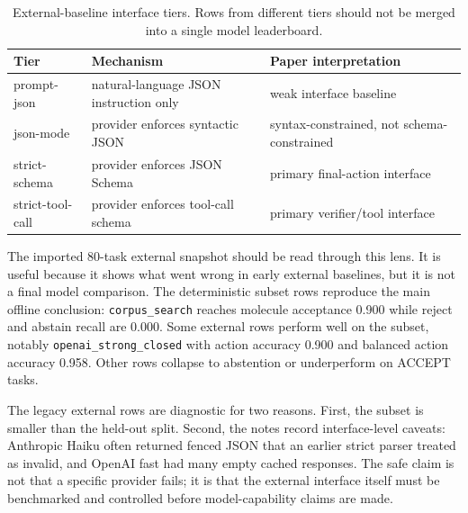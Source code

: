\documentclass[11pt]{article}
\begin{document}
\begin{table}[htbp]
\centering
\caption{External-baseline interface tiers. Rows from different tiers should not
be merged into a single model leaderboard.}
\label{tab:interface-tiers}
\small
\begin{tabular}{lll}
\toprule
Tier & Mechanism & Paper interpretation \\
\midrule
prompt-json & natural-language JSON instruction only & weak interface baseline \\
json-mode & provider enforces syntactic JSON & syntax-constrained, not schema-constrained \\
strict-schema & provider enforces JSON Schema & primary final-action interface \\
strict-tool-call & provider enforces tool-call schema & primary verifier/tool interface \\
\bottomrule
\end{tabular}
\end{table}

The imported 80-task external snapshot should be read through this lens. It is
useful because it shows what went wrong in early external baselines, but it is
not a final model comparison. The deterministic subset rows reproduce the main
offline conclusion: \texttt{corpus\_search} reaches molecule acceptance 0.900
while reject and abstain recall are 0.000. Some external rows perform well on
the subset, notably \texttt{openai\_strong\_closed} with action accuracy 0.900
and balanced action accuracy 0.958. Other rows collapse to abstention or
underperform on ACCEPT tasks.

The legacy external rows are diagnostic for two reasons. First, the subset is
smaller than the held-out split. Second, the notes record interface-level
caveats: Anthropic Haiku often returned fenced JSON that an earlier strict parser
treated as invalid, and OpenAI fast had many empty cached responses. The safe
claim is not that a specific provider fails; it is that the external interface
itself must be benchmarked and controlled before model-capability claims are
made.
\end{document}

